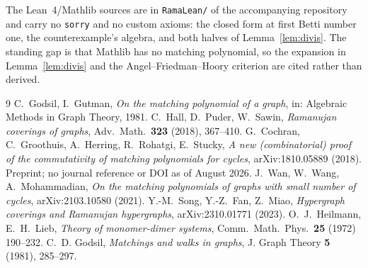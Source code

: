 \documentclass[11pt]{article}
\theoremstyle{remark}
\begin{document}
The Lean~4/Mathlib sources are in \texttt{RamaLean/} of the accompanying repository and carry no
\texttt{sorry} and no custom axioms: the closed form at first Betti number one, the
counterexample's algebra, and both halves of Lemma~\ref{lem:divis}. The standing gap is that
Mathlib has no matching polynomial, so the expansion in Lemma~\ref{lem:divis} and the
Angel--Friedman--Hoory criterion are cited rather than derived.

\begin{thebibliography}{9}
 C.~Godsil, I.~Gutman, \emph{On the matching polynomial of a
graph}, in: Algebraic Methods in Graph Theory, 1981.
 C.~Hall, D.~Puder, W.~Sawin, \emph{Ramanujan coverings of
graphs}, Adv.\ Math.\ \textbf{323} (2018), 367--410.
 G.~Cochran, C.~Groothuis, A.~Herring, R.~Rohatgi,
E.~Stucky, \emph{A new (combinatorial) proof of the commutativity of
matching polynomials for cycles}, arXiv:1810.05889 (2018). Preprint; no journal
reference or DOI as of August 2026.
 J.~Wan, W.~Wang, A.~Mohammadian, \emph{On the matching
polynomials of graphs with small number of cycles}, arXiv:2103.10580 (2021).
 Y.-M.~Song, Y.-Z.~Fan, Z.~Miao, \emph{Hypergraph coverings and
Ramanujan hypergraphs}, arXiv:2310.01771 (2023).
 O.~J.~Heilmann, E.~H.~Lieb, \emph{Theory of monomer-dimer
systems}, Comm.\ Math.\ Phys.\ \textbf{25} (1972) 190--232.
 C.~D. Godsil, \emph{Matchings and walks in graphs},
J. Graph Theory \textbf{5} (1981), 285--297.


\end{thebibliography}
\end{document}
